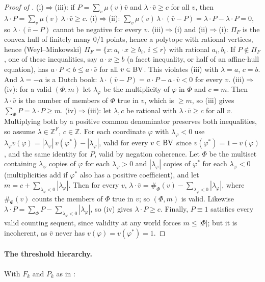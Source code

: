 \begin{proof}[Proof of ]
(i)$\Rightarrow$(iii): if $P=\sum_v\mu(v)\bar v$ and $\lambda\cdot\bar v\ge c$ for all $v$, then $\lambda\cdot P=\sum_v\mu(v)\,\lambda\cdot\bar v\ge c$.
(i)$\Rightarrow$(ii): $\sum_v\mu(v)\,\lambda\cdot(\bar v-P)=\lambda\cdot P-\lambda\cdot P=0$, so $\lambda\cdot(\bar v-P)$ cannot be negative for every $v$.
(iii)$\Rightarrow$(i) and (ii)$\Rightarrow$(i): $\Pi_F$ is the convex hull of finitely many $0/1$ points, hence a polytope with rational vertices, hence (Weyl--Minkowski) $\Pi_F=\{x:a_i\cdot x\ge b_i,\ i\le r\}$ with rational $a_i,b_i$. If $P\notin\Pi_F$, one of these inequalities, say $a\cdot x\ge b$ (a facet inequality, or half of an affine-hull equation), has $a\cdot P<b\le a\cdot\bar v$ for all $v\in\mathrm{BV}$. This violates (iii) with $\lambda=a$, $c=b$. And $\lambda=-a$ is a Dutch book: $\lambda\cdot(\bar v-P)=a\cdot P-a\cdot\bar v<0$ for every $v$.
(iii)$\Rightarrow$(iv): for a valid $(\Phi,m)$ let $\lambda_\varphi$ be the multiplicity of $\varphi$ in $\Phi$ and $c=m$. Then $\lambda\cdot\bar v$ is the number of members of $\Phi$ true in $v$, which is $\ge m$, so (iii) gives $\sum_\Phi P=\lambda\cdot P\ge m$.
(iv)$\Rightarrow$(iii): let $\lambda,c$ be rational with $\lambda\cdot\bar v\ge c$ for all $v$. Multiplying both by a positive common denominator preserves both inequalities, so assume $\lambda\in\mathbb Z^F$, $c\in\mathbb Z$. For each coordinate $\varphi$ with $\lambda_\varphi<0$ use $\lambda_\varphi v(\varphi)=|\lambda_\varphi|\,v(\varphi^*)-|\lambda_\varphi|$, valid for every $v\in\mathrm{BV}$ since $v(\varphi^*)=1-v(\varphi)$, and the same identity for $P$, valid by negation coherence. Let $\Phi$ be the multiset containing $\lambda_\varphi$ copies of $\varphi$ for each $\lambda_\varphi>0$ and $|\lambda_\varphi|$ copies of $\varphi^*$ for each $\lambda_\varphi<0$ (multiplicities add if $\varphi^*$ also has a positive coefficient), and let $m=c+\sum_{\lambda_\varphi<0}|\lambda_\varphi|$. Then for every $v$, $\lambda\cdot\bar v=\#_\Phi(v)-\sum_{\lambda_\varphi<0}|\lambda_\varphi|$, where $\#_\Phi(v)$ counts the members of $\Phi$ true in $v$; so $(\Phi,m)$ is valid. Likewise $\lambda\cdot P=\sum_\Phi P-\sum_{\lambda_\varphi<0}|\lambda_\varphi|$, so (iv) gives $\lambda\cdot P\ge c$.
Finally, $P\equiv1$ satisfies every valid counting sequent, since validity at any world forces $m\le|\Phi|$; but it is incoherent, as $\bar v$ never has $v(\varphi)=v(\varphi^*)=1$.
\end{proof}

\paragraph{The threshold hierarchy.} With $F_k$ and $P_k$ as in :

